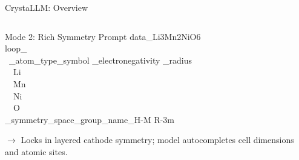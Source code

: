 \documentclass[aspectratio=169, 11pt]{beamer}
\begin{document}
\begin{frame}{CrystaLLM: Overview~\cite{antunes2024crystallm}}
\begin{columns}[T]
    \begin{block}{\footnotesize Mode 2: Rich Symmetry Prompt}
      \vspace{0.05cm}
      \ttfamily\scriptsize
      data\_Li3Mn2NiO6 \\
      loop\_ \\
      \ \_atom\_type\_symbol \_electronegativity \_radius \\
      \ \ Li   \\
      \ \ Mn   \\
      \ \ Ni   \\
      \ \ O    \\
      \_symmetry\_space\_group\_name\_H-M R-3m \par
      \vspace{0.08cm}
      \normalfont\scriptsize \textcolor{black!70}{$\to$ Locks in layered cathode symmetry; model autocompletes cell dimensions and atomic sites.}
    \end{block}
\end{columns}
\end{frame}
\end{document}
